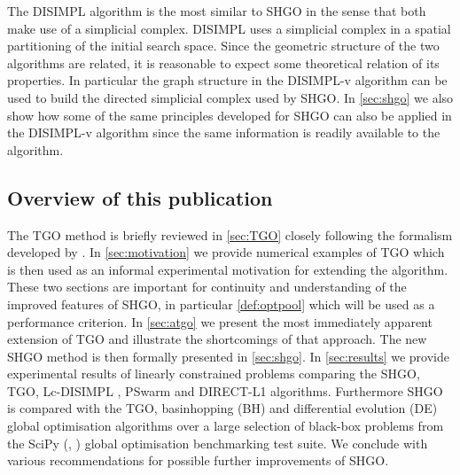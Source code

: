 The DISIMPL algorithm is the most similar to SHGO in the sense that both make use of a simplicial complex. DISIMPL uses a simplicial complex in a  spatial partitioning of the initial search space. Since the geometric structure of the two algorithms are related, it is reasonable to expect some theoretical relation of its properties. In particular the graph structure in the DISIMPL-v algorithm \cite{Paul2016} can be used to build the directed simplicial complex used by SHGO. In \autoref{sec:shgo} we also show how some of the same principles developed for SHGO can also be applied in the DISIMPL-v algorithm since the same information is readily available to the algorithm.
 
\subsection{Overview of this publication}
The TGO method is briefly reviewed in \autoref{sec:TGO} closely following the formalism developed by \citet{Henderson2015}. In \autoref{sec:motivation} we provide numerical examples of TGO which is then used as an informal experimental motivation for extending the algorithm. These two sections are important for continuity and understanding of the improved features of SHGO, in particular \autoref{def:optpool} which will be used as a performance criterion. In \autoref{sec:atgo} we present the most immediately apparent extension of TGO and illustrate the shortcomings of that approach. The new SHGO method is then formally presented in \autoref{sec:shgo}. In \autoref{sec:results} we provide experimental results of linearly constrained problems comparing the SHGO, TGO, Lc-DISIMPL \cite{Paul2016}, PSwarm \cite{Vaz2008} and DIRECT-L1 \cite{finkel2003direct} algorithms. Furthermore SHGO is compared with the TGO, basinhopping (BH) and differential evolution (DE) global optimisation algorithms over a large selection of black-box problems from the SciPy (\citeauthor*{scipy}, \citeyear{scipy}) global optimisation benchmarking test suite. We conclude with various recommendations for possible further improvements of SHGO.